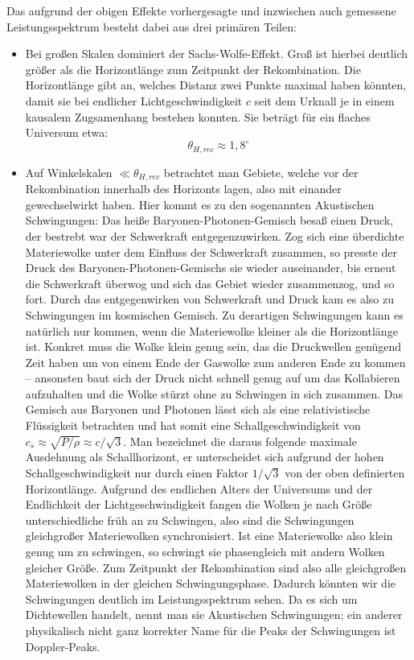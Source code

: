 \documentclass[10pt,a4paper]{article}
\begin{document}
Das aufgrund der obigen Effekte vorhergesagte und inzwischen auch gemessene Leistungsspektrum besteht dabei aus drei primären Teilen:
\begin{itemize}
\item Bei großen Skalen dominiert der Sachs-Wolfe-Effekt. Groß ist hierbei deutlich größer als die Horizontlänge zum Zeitpunkt der Rekombination. Die Horizontlänge gibt an, welches Distanz zwei Punkte maximal haben könnten, damit sie bei endlicher Lichtgeschwindigkeit $c$ seit dem Urknall je in einem kausalem Zugsamenhang bestehen konnten. Sie beträgt für ein flaches Universum etwa:
\[ \theta_{H,rec} \approx 1,8^\circ \]
\item Auf Winkelskalen $\ll\theta_{H,rec}$ betrachtet man Gebiete, welche vor der Rekombination innerhalb des Horizonts lagen, also mit einander gewechselwirkt haben. Hier kommt es zu den sogenannten Akustischen Schwingungen:
Das heiße Baryonen-Photonen-Gemisch besaß einen Druck, der bestrebt war der Schwerkraft entgegenzuwirken. Zog sich eine überdichte Materiewolke unter dem Einfluss der Schwerkraft zusammen, so presste der Druck des Baryonen-Photonen-Gemischs sie wieder auseinander, bis erneut die Schwerkraft überwog und sich das Gebiet wieder zusammenzog, und so fort. Durch das entgegenwirken von Schwerkraft und Druck kam es also zu Schwingungen im kosmischen Gemisch.
Zu derartigen Schwingungen kann es natürlich nur kommen, wenn die Materiewolke kleiner als die Horizontlänge ist. Konkret muss die Wolke klein genug sein, das die Druckwellen genügend Zeit haben um von einem Ende der Gaswolke zum anderen Ende zu kommen -- ansonsten baut sich der Druck nicht schnell genug auf um das Kollabieren aufzuhalten und die Wolke stürzt ohne zu Schwingen in sich zusammen. Das Gemisch aus Baryonen und Photonen lässt sich als eine relativistische Flüssigkeit betrachten und hat somit eine Schallgeschwindigkeit von $c_s\approx\sqrt{P/\rho}\approx c/\sqrt{3}$.\cite{Schneider} Man bezeichnet die daraus folgende maximale Ausdehnung als Schallhorizont, er unterscheidet sich aufgrund der hohen Schallgeschwindigkeit nur durch einen Faktor $1/\sqrt3$ von der oben definierten Horizontlänge.
Aufgrund des endlichen Alters der Universums und der Endlichkeit der Lichtgeschwindigkeit fangen die Wolken je nach Größe unterschiedliche früh an zu Schwingen, also sind die Schwingungen gleichgroßer Materiewolken synchronisiert. Ist eine Materiewolke also klein genug um zu schwingen, so schwingt sie phasengleich mit andern Wolken gleicher Größe. Zum Zeitpunkt der Rekombination sind also alle gleichgroßen Materiewolken in der gleichen Schwingungsphase. Dadurch könnten wir die Schwingungen deutlich im Leistungsspektrum sehen. Da es sich um Dichtewellen handelt, nennt man sie Akustischen Schwingungen; ein anderer physikalisch nicht ganz korrekter Name für die Peaks der Schwingungen ist Doppler-Peaks.

\end{itemize}
\end{document}
